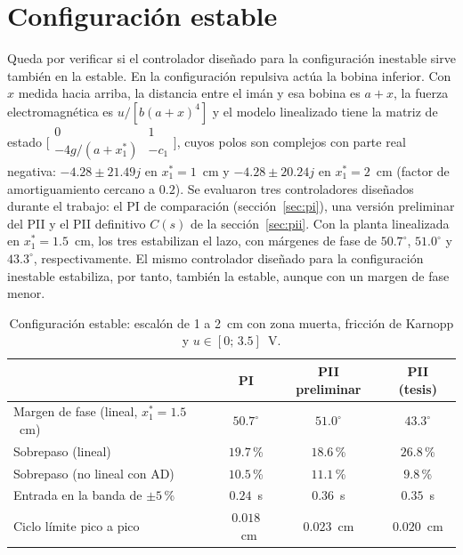 \FloatBarrier

\section{Configuración estable}

Queda por verificar si el controlador diseñado para la configuración inestable sirve también en la estable. En la configuración repulsiva actúa la bobina inferior. Con $x$ medida hacia arriba, la distancia entre el imán y esa bobina es $a+x$, la fuerza electromagnética es $u/[b(a+x)^4]$ y el modelo linealizado tiene la matriz de estado $\bigl[\begin{smallmatrix}0&1\\-4g/(a+x_1^*)&-c_1\end{smallmatrix}\bigr]$, cuyos polos son complejos con parte real negativa: $-4.28\pm21.49j$ en $x_1^*=1$~cm y $-4.28\pm20.24j$ en $x_1^*=2$~cm (factor de amortiguamiento cercano a $0.2$). Se evaluaron tres controladores diseñados durante el trabajo: el PI de comparación (sección~\ref{sec:pi}), una versión preliminar del PII y el PII definitivo $C(s)$ de la sección~\ref{sec:pii}. Con la planta linealizada en $x_1^*=1.5$~cm, los tres estabilizan el lazo, con márgenes de fase de $50.7^\circ$, $51.0^\circ$ y $43.3^\circ$, respectivamente. El mismo controlador diseñado para la configuración inestable estabiliza, por tanto, también la estable, aunque con un margen de fase menor.

\begin{table}[ht]
\centering
\caption{Configuración estable: escalón de 1 a 2~cm con zona muerta, fricción de Karnopp y $u\in[0;\,3.5]$~V.}
\label{tab:p8_estable}
\begin{tabular}{|l|c|c|c|}
\hline
 & PI & PII preliminar & PII (tesis) \\ \hline
Margen de fase (lineal, $x_1^*=1.5$~cm) & $50.7^\circ$ & $51.0^\circ$ & $43.3^\circ$ \\ \hline
Sobrepaso (lineal) & $19.7$\,\% & $18.6$\,\% & $26.8$\,\% \\ \hline
Sobrepaso (no lineal con AD) & $10.5$\,\% & $11.1$\,\% & $9.8$\,\% \\ \hline
Entrada en la banda de $\pm5$\,\% & $0.24$~s & $0.36$~s & $0.35$~s \\ \hline
Ciclo límite pico a pico & $0.018$~cm & $0.023$~cm & $0.020$~cm \\ \hline
\end{tabular}
\end{table}

